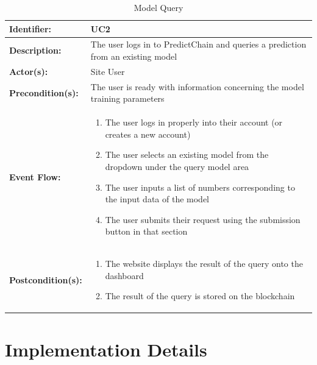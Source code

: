 \documentclass{article}
\begin{document}
    \begin{table}[H]
        \caption{Model Query}
        \label{tab:model-query}
        \centering
        \begin{tabular}{|p{3cm}|p{12cm}|}
            \hline
            \textbf{Identifier:} & UC2 \\
            \hline
            \textbf{Description:} & The user logs in to PredictChain and queries a prediction from an existing model\\
            \hline
            \textbf{Actor(s):} & Site User \\
            \hline
            \textbf{Precondition(s):} & The user is ready with information concerning the model training parameters \\
            \hline
            \textbf{Event Flow:} &
            \begin{enumerate}
                \item The user logs in properly into their account (or creates a new account)
                \item The user selects an existing model from the dropdown under the query model area
                \item The user inputs a list of numbers corresponding to the input data of the model
                \item The user submits their request using the submission button in that section
            \end{enumerate} \\
            \hline
            \textbf{Postcondition(s):} &
            \begin{enumerate}
                \item The website displays the result of the query onto the dashboard
                \item The result of the query is stored on the blockchain
            \end{enumerate}\\
            \hline
        \end{tabular}
    \end{table}

    \section{Implementation Details}

\end{document}
